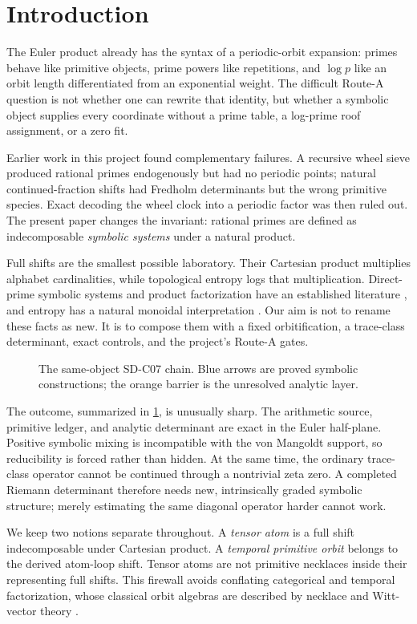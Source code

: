 \section{Introduction}

The Euler product already has the syntax of a periodic-orbit expansion:
primes behave like primitive objects, prime powers like repetitions, and
$\log p$ like an orbit length differentiated from an exponential weight.
The difficult Route-A question is not whether one can rewrite that identity,
but whether a symbolic object supplies every coordinate without a prime
table, a log-prime roof assignment, or a zero fit.

Earlier work in this project found complementary failures.  A recursive
wheel sieve produced rational primes endogenously but had no periodic points;
natural continued-fraction shifts had Fredholm determinants but the wrong
primitive species.  Exact decoding the wheel clock into a periodic factor was
then ruled out.  The present paper changes the invariant: rational primes are
defined as indecomposable \emph{symbolic systems} under a natural product.

Full shifts are the smallest possible laboratory.  Their Cartesian product
multiplies alphabet cardinalities, while topological entropy logs that
multiplication.  Direct-prime symbolic systems and product factorization have
an established literature \citep{lind1984,meyerovitch2017,kopra2023}, and
entropy has a natural monoidal interpretation \citep{delvenne2019}.  Our aim
is not to rename these facts as new.  It is to compose them with a fixed
orbitification, a trace-class determinant, exact controls, and the project's
Route-A gates.

\begin{figure}[t]
  \centering
  
  \caption{The same-object SD-C07 chain.  Blue arrows are proved symbolic
  constructions; the orange barrier is the unresolved analytic layer.}
  \label{fig:route-a-chain}
\end{figure}

The outcome, summarized in \cref{fig:route-a-chain}, is unusually sharp.
The arithmetic source, primitive ledger, and analytic determinant are exact
in the Euler half-plane.  Positive symbolic mixing is incompatible with the
von Mangoldt support, so reducibility is forced rather than hidden.  At the
same time, the ordinary trace-class operator cannot be continued through a
nontrivial zeta zero.  A completed Riemann determinant therefore needs new,
intrinsically graded symbolic structure; merely estimating the same diagonal
operator harder cannot work.

We keep two notions separate throughout.  A \emph{tensor atom} is a full
shift indecomposable under Cartesian product.  A \emph{temporal primitive
orbit} belongs to the derived atom-loop shift.  Tensor atoms are not primitive
necklaces inside their representing full shifts.  This firewall avoids
conflating categorical and temporal factorization, whose classical orbit
algebras are described by necklace and Witt-vector theory
\citep{metropolisrota1983,dresssiebeneicher1989}.
